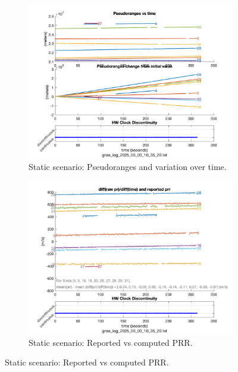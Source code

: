             \begin{figure}[h!]
                \centering
                \begin{subfigure}{0.23\textwidth}
                    \centering
                    \includegraphics[width=\textwidth]{images/Monte_Cappuccini/filtered/Samsung_A51_Monte_Cappuccini_fig1.png}
                    \caption{Static scenario: Pseudoranges and variation over time.}
                    \label{fig:static_pr}
                \end{subfigure}
                \hfill
                \begin{subfigure}{0.23\textwidth}
                    \centering
                    \includegraphics[width=\textwidth]{images/Monte_Cappuccini/filtered/Samsung_A51_Monte_Cappuccini_fig2.png}
                    \caption{Static scenario: Reported vs computed PRR.}
                    \label{fig:static_prr}
                \end{subfigure}
                \vspace{0.35cm}
                \label{fig:gnss_comparison}
            \end{figure}

